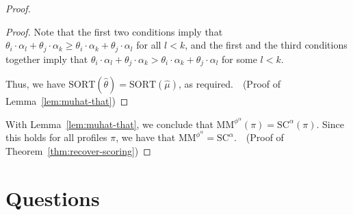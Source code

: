 \documentclass[10pt,letterpaper]{article}
\newcommand{\scr}{{\text{SC}}}
\newcommand{\mm}{\text{MM}}
\newcommand{\sca}{{\scr^{\alpha}}}
\newcommand{\sort}{\text{SORT}}
\newcommand{\phia}{\phi^{\alpha}}
\newcommand{\mmphia}{\mm^{\phia}}
\newcommand{\muhat}{\hat{\mu}}
\newcommand{\that}{\hat{\theta}}
\begin{document}
\begin{proof}
\begin{proof}
Note that the first two conditions imply that $\theta_i \cdot \alpha_l + \theta_j \cdot \alpha_k \ge \theta_i \cdot \alpha_k + \theta_j \cdot \alpha_l$ for all $l < k$, and the first and the third conditions together imply that $\theta_i \cdot \alpha_l + \theta_j \cdot \alpha_k > \theta_i \cdot \alpha_k + \theta_j \cdot \alpha_l$ for some $l < k$. 

Thus, we have $\sort(\that) = \sort(\muhat)$, as required.~\qedhere~(Proof of Lemma~\ref{lem:muhat-that})
\end{proof}

With Lemma~\ref{lem:muhat-that}, we conclude that $\mmphia(\pi) = \sca(\pi)$. Since this holds for all profiles $\pi$, we have that $\mmphia = \sca$.~\qedhere~(Proof of Theorem~\ref{thm:recover-scoring})
\end{proof}

\newpage

\section{Questions}
\end{document}
